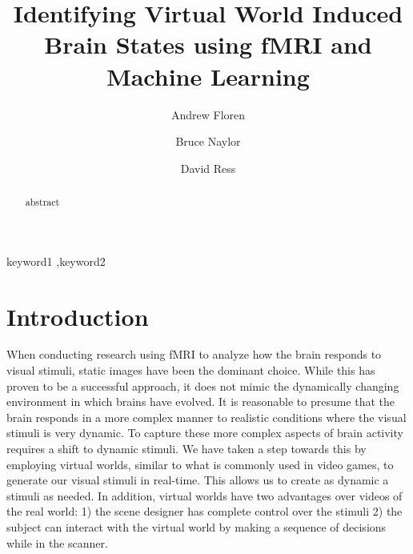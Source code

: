 \documentclass[preprint,5p,authoryear]{elsarticle}
\begin{document}
\begin{frontmatter}

\title{Identifying Virtual World Induced Brain States using fMRI and Machine Learning}

\author[UT]{Andrew Floren}

\author[UT]{Bruce Naylor}

\author[UT]{David Ress}

\address[UT]{The University of Texas at Austin, Austin, TX 78712 USA}


\begin{abstract}
abstract
\end{abstract}

\begin{keyword}
keyword1 \sep keyword2
\end{keyword}

\end{frontmatter}

\section{Introduction}
When conducting research using fMRI to analyze how the brain responds to visual stimuli, static images have been  the dominant choice.
While this has proven to be a successful approach, it does not mimic the dynamically changing environment in which brains have evolved.
It is reasonable to presume that the brain responds in a more complex manner to realistic conditions where the visual stimuli is very dynamic.
To capture these more complex aspects of brain activity requires a shift to dynamic stimuli.
We have taken a step towards this by employing virtual worlds, similar to what is commonly used in video games, to generate our visual stimuli in real-time.
This allows us to create as dynamic a stimuli as needed.
In addition, virtual worlds have two advantages over videos of the real world: 1) the scene designer has complete control over the stimuli 2) the subject can interact with the virtual world by making a sequence of decisions while in the scanner.
\end{document}
